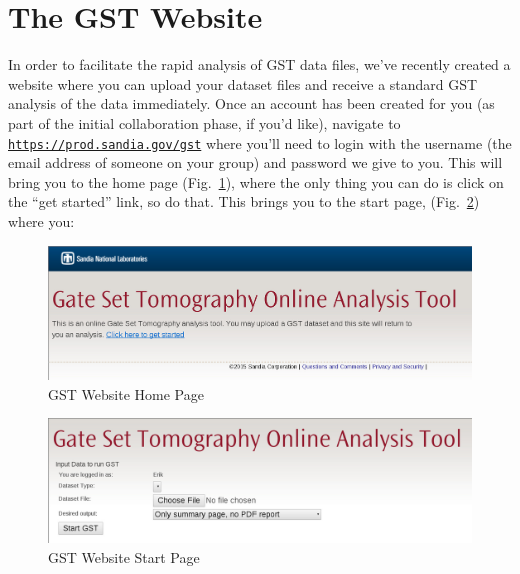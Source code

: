 \documentclass{article}[11pt]
\begin{document}
\section{The GST Website\label{secWebsite}}

In order to facilitate the rapid analysis of GST data files, we've recently created a website where you can upload your dataset files and receive a standard GST analysis of the data immediately.  Once an account has been created for you (as part of the initial collaboration phase, if you'd like), navigate to \texttt{\href{https://prod.sandia.gov/gst}{https://prod.sandia.gov/gst}} where you'll need to login with the username (the email address of someone on your group) and password we give to you.  This will bring you to the home page (Fig.~\ref{figHomePage}), where the only thing you can do is click on the ``get started'' link, so do that.  This brings you to the start page, (Fig.~\ref{figStartPage}) where you:


\begin{figure}[h!]
\begin{center}
\includegraphics[width=6in]{QuickStartResources/HomePage.jpg}
\caption{GST Website Home Page\label{figHomePage}}
\end{center}
\end{figure}

\begin{figure}[h!]
\begin{center}
\includegraphics[width=6in]{QuickStartResources/StartPage.jpg}
\caption{GST Website Start Page\label{figStartPage}}
\end{center}
\end{figure}
\end{document}
